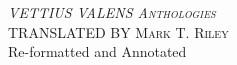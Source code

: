 \begin{titlingpage}
\centering
{\Huge\scshape \textsl{VETTIUS VALENS Anthologies}\\ [1in]}
{\small\scshape TRANSLATED BY Mark T. Riley} \\
{\tiny Re-formatted and Annotated}
\end{titlingpage}